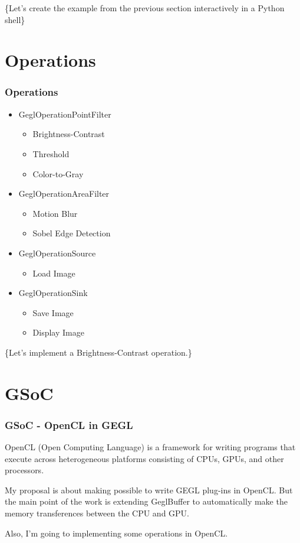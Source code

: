 \documentclass{beamer}
\begin{document}
\begin{frame}
  \{Let's create the example from the previous section interactively in a Python shell\}
\end{frame}

\section{Operations}

\begin{frame}
\frametitle{Operations}

\begin{itemize}
\item{GeglOperationPointFilter}
\begin{itemize} \item{Brightness-Contrast} \item{Threshold} \item{Color-to-Gray} \end{itemize}
\item{GeglOperationAreaFilter}
\begin{itemize} \item{Motion Blur} \item{Sobel Edge Detection} \end{itemize}
\item{GeglOperationSource}
\begin{itemize} \item{Load Image} \end{itemize}
\item{GeglOperationSink}
\begin{itemize} \item{Save Image} \item{Display Image} \end{itemize}
\end{itemize}
\end{frame}

\begin{frame}
  \{Let's implement a Brightness-Contrast operation.\}
\end{frame}

\section{GSoC}

\begin{frame}
  \frametitle{GSoC - OpenCL in GEGL}

OpenCL (Open Computing Language) is a framework for
writing programs that execute across heterogeneous
platforms consisting of CPUs, GPUs, and other processors.

My proposal is about making possible to write GEGL plug-ins in OpenCL.
But the main point of the work is extending GeglBuffer to automatically
make the memory transferences between the CPU and GPU.

Also, I'm going to implementing some operations in OpenCL.
\end{frame}
\end{document}
